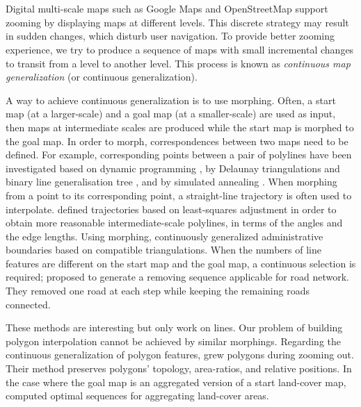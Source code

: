 \chapter[\BldgGrowToCTitle]{\BldgGrowTitle} 
\label{chap:Bldg}

\chaptermark{\BldgGrowChapterMark}

Digital multi-scale maps such as Google Maps and OpenStreetMap 
support zooming by displaying maps at different levels. 
This discrete strategy may result in sudden changes, 
which disturb user navigation.
To provide better zooming experience, 
we try to produce a sequence of maps 
with small incremental changes to transit 
from a level to another level.
This process is known as \emph{continuous map generalization} 
(or continuous generalization).

A way to achieve continuous generalization is to use morphing.
Often, a start map (at a larger-scale) and 
a goal map (at a smaller-scale) 
are used as input, 
then maps at intermediate scales are produced 
while the start map is morphed to the goal map.
In order to morph, correspondences 
between two maps need to be defined.
For example, corresponding points 
between a pair of polylines have been investigated based on 
dynamic programming \citep{Noellenburg2008}, 
by Delaunay triangulations and 
binary line generalisation tree \citep{Deng2015},
and by simulated annealing \citep{Li2017Annealing}.
When morphing from a point to its corresponding point,
a straight-line trajectory is often used to interpolate.
\citet{Peng2013LSA} defined trajectories 
based on least-squares adjustment 
in order to obtain more reasonable intermediate-scale polylines,
in terms of the angles and the edge lengths.
Using morphing, \citet{Peng2016Admin} continuously generalized 
administrative boundaries based on compatible triangulations. 
When the numbers of line features are different 
on the start map and the goal map, 
a continuous selection is required; 
\citet{Chimani2014Eat} proposed to generate a 
removing sequence applicable for road network.
They removed one road at each step
while keeping the remaining roads connected.

These methods are interesting but only work on lines. 
Our problem of building polygon interpolation 
cannot be achieved by similar morphings. 
Regarding the continuous generalization of polygon features,
\citet{Danciger2009} grew polygons during zooming out. 
Their method preserves polygons' 
topology, area-ratios, and relative positions.  
In the case where the goal map is an aggregated version of 
a start land-cover map, 
\citet{Peng2017AStar} computed optimal sequences 
for aggregating land-cover areas.

